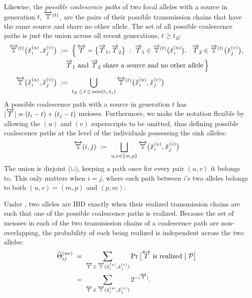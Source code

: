 \documentclass[12pt]{article}
\numberwithin{equation}{section}
\begin{document}
Likewise, the \emph{possible coalescence paths} of two focal alleles with a source in generation $t$, $\overleftrightarrow{\mathbb{T}}^{(t)}$, are the pairs of their possible transmission chains that have the same source and share no other allele.
The set of all possible coalescence paths is just the union across all recent generations, $t \geq t_B$:
\begin{equation}\label{eq:possible-cpaths}
\begin{aligned}
    \overleftrightarrow{\mathbb{T}}^{(t)}\big(\mathring{x}_i^{(u)}, \mathring{x}_j^{(v)}\big)
    \;&:=\; \Big\{\, \overleftrightarrow{T} = \big\{\overrightarrow{T}_1, \overrightarrow{T}_2\big\} \;:\;
    \overrightarrow{T}_1 \in \overrightarrow{\mathbb{T}}^{(t)}\big(\mathring{x}_i^{(u)}\big),\ \
    \overrightarrow{T}_2 \in \overrightarrow{\mathbb{T}}^{(t)}\big(\mathring{x}_j^{(v)}\big), \\
    &\quad \overrightarrow{T}_1 \text{ and } \overrightarrow{T}_2 \text{ share a source and no other allele} \,\Big\} \\[4pt]
    \overleftrightarrow{\mathbb{T}}\big(\mathring{x}_i^{(u)}, \mathring{x}_j^{(v)}\big)
    \;&:=\; \bigcup_{t_B \,\leq\, t \,\leq\, \min(t_i, t_j)} \overleftrightarrow{\mathbb{T}}^{(t)}\big(\mathring{x}_i^{(u)}, \mathring{x}_j^{(v)}\big)
\end{aligned}
\end{equation}
A possible coalescence path with a source in generation $t$ has $|\overleftrightarrow{T}| = (t_i - t) + (t_j - t)$ meioses.
Furthermore, we make the notation flexible by allowing the $(u)$ and $(v)$ superscripts to be omitted, thus defining possible coalescence paths at the level of the individuals possessing the sink alleles:
\begin{equation}\label{eq:possible-cpaths-ind}
    \overleftrightarrow{\mathbb{T}}(i,j) \;:=\; \bigsqcup_{u,v \in \{m,p\}} \overleftrightarrow{\mathbb{T}}\big(\mathring{x}_i^{(u)}, \mathring{x}_j^{(v)}\big)
\end{equation}
The union is disjoint ($\sqcup$), keeping a path once for every pair $(u,v)$ it belongs to.
This only matters when $i = j$, where each path between $i$'s two alleles belongs to both $(u,v) = (m,p)$ and $(p,m)$.

Under , two alleles are IBD exactly when their realized transmission chains are such that one of the possible coalescence paths is realized.
Because the set of meioses in each of the two transmission chains of a coalescence path are non-overlapping, the probability of each being realized is independent across the two alleles:
\begin{equation}\label{eq:ibd-cpaths}
\begin{aligned}
    \widehat\Theta^{(uv)}_{ij}
    \;&=\; \sum_{\overleftrightarrow{T} \,\in\, \overleftrightarrow{\mathbb{T}}(\mathring{x}_i^{(u)}, \mathring{x}_j^{(v)})} \Pr\big[\overleftrightarrow{T} \text{ is realized} \;\big|\; \mathcal{P}\big] \\
    \;&=\; \sum_{\overleftrightarrow{T} \,\in\, \overleftrightarrow{\mathbb{T}}(\mathring{x}_i^{(u)}, \mathring{x}_j^{(v)})} 2^{-|\overleftrightarrow{T}|} .
\end{aligned}
\end{equation}
\end{document}
